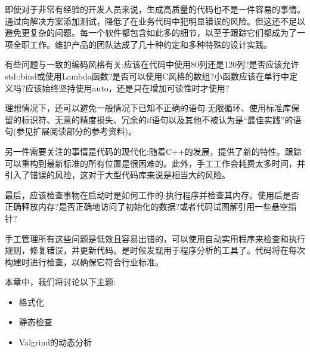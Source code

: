 即使对于非常有经验的开发人员来说，生成高质量的代码也不是一件容易的事情。通过向解决方案添加测试，降低了在业务代码中犯明显错误的风险。但这还不足以避免更复杂的问题。每一个软件都包含如此多的细节，以至于跟踪它们都成为了一项全职工作。维护产品的团队达成了几十种约定和多种特殊的设计实践。

有些问题与一致的编码风格有关:应该在代码中使用80列还是120列?是否应该允许std::bind或使用Lambda函数?是否可以使用C风格的数组?小函数应该在单行中定义吗?应该始终坚持使用auto，还是只在增加可读性时才使用?

理想情况下，还可以避免一般情况下已知不正确的语句:无限循环、使用标准库保留的标识符、无意的精度损失、冗余的if语句以及其他不被认为是“最佳实践”的语句(参见扩展阅读部分的参考资料)。

另一件需要关注的事情是代码的现代化:随着C++的发展，提供了新的特性。跟踪可以重构到最新标准的所有位置是很困难的。此外，手工工作会耗费太多时间，并引入了错误的风险，这对于大型代码库来说是相当大的风险。

最后，应该检查事物在启动时是如何工作的:执行程序并检查其内存。使用后是否正确释放内存?是否正确地访问了初始化的数据?或者代码试图解引用一些悬空指针?

手工管理所有这些问题是低效且容易出错的，可以使用自动实用程序来检查和执行规则，修复错误，并更新代码。是时候发现用于程序分析的工具了。代码将在每次构建时进行检查，以确保它符合行业标准。

本章中，我们将讨论以下主题:

\begin{itemize}
\item 
格式化

\item 
静态检查

\item 
Valgrind的动态分析
\end{itemize}













